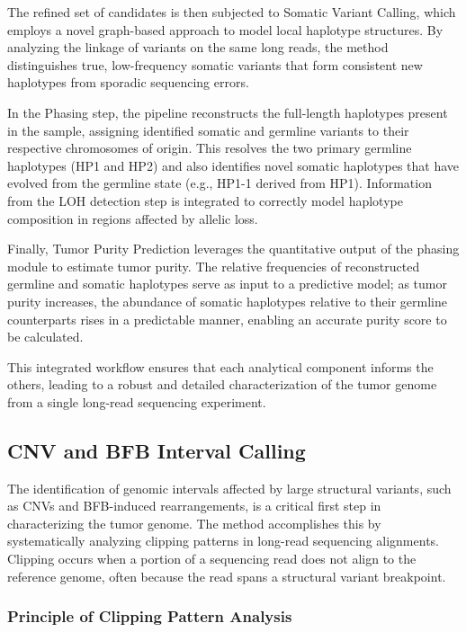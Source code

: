 \documentclass[pdflatex,sn-nature]{sn-jnl}
\begin{document}
The refined set of candidates is then subjected to Somatic Variant Calling, which employs a novel graph-based approach to model local haplotype structures. By analyzing the linkage of variants on the same long reads, the method distinguishes true, low-frequency somatic variants that form consistent new haplotypes from sporadic sequencing errors.

In the Phasing step, the pipeline reconstructs the full-length haplotypes present in the sample, assigning identified somatic and germline variants to their respective chromosomes of origin. This resolves the two primary germline haplotypes (HP1 and HP2) and also identifies novel somatic haplotypes that have evolved from the germline state (e.g., HP1-1 derived from HP1). Information from the LOH detection step is integrated to correctly model haplotype composition in regions affected by allelic loss.

Finally, Tumor Purity Prediction leverages the quantitative output of the phasing module to estimate tumor purity. The relative frequencies of reconstructed germline and somatic haplotypes serve as input to a predictive model; as tumor purity increases, the abundance of somatic haplotypes relative to their germline counterparts rises in a predictable manner, enabling an accurate purity score to be calculated.

This integrated workflow ensures that each analytical component informs the others, leading to a robust and detailed characterization of the tumor genome from a single long-read sequencing experiment.

\subsection{CNV and BFB Interval Calling}\label{cnv-and-bfb-interval-calling}

The identification of genomic intervals affected by large structural variants, such as CNVs and BFB-induced rearrangements, is a critical first step in characterizing the tumor genome. The method accomplishes this by systematically analyzing clipping patterns in long-read sequencing alignments. Clipping occurs when a portion of a sequencing read does not align to the reference genome, often because the read spans a structural variant breakpoint.

\subsubsection{Principle of Clipping Pattern Analysis}\label{principle-of-clipping-pattern-analysis}
\end{document}
